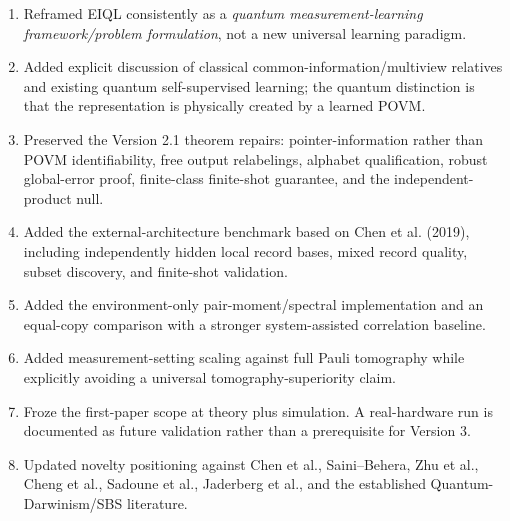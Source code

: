 \begin{enumerate}
\item Reframed EIQL consistently as a \emph{quantum measurement-learning framework/problem formulation}, not a new universal learning paradigm.
\item Added explicit discussion of classical common-information/multiview relatives and existing quantum self-supervised learning; the quantum distinction is that the representation is physically created by a learned POVM.
\item Preserved the Version 2.1 theorem repairs: pointer-information rather than POVM identifiability, free output relabelings, alphabet qualification, robust global-error proof, finite-class finite-shot guarantee, and the independent-product null.
\item Added the external-architecture benchmark based on Chen et al. (2019), including independently hidden local record bases, mixed record quality, subset discovery, and finite-shot validation.
\item Added the environment-only pair-moment/spectral implementation and an equal-copy comparison with a stronger system-assisted correlation baseline.
\item Added measurement-setting scaling against full Pauli tomography while explicitly avoiding a universal tomography-superiority claim.
\item Froze the first-paper scope at theory plus simulation. A real-hardware run is documented as future validation rather than a prerequisite for Version 3.
\item Updated novelty positioning against Chen et al., Saini--Behera, Zhu et al., Cheng et al., Sadoune et al., Jaderberg et al., and the established Quantum-Darwinism/SBS literature.
\end{enumerate}

